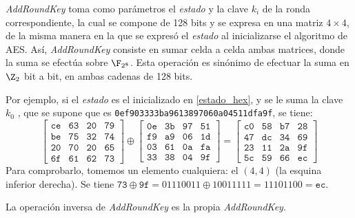\textit{AddRoundKey} toma como parámetros el \textit{estado} y la clave $k_i$ de la ronda correspondiente, la cual se compone de 128 bits y se expresa en una matriz $4 \times 4$, de la misma manera en la que se expresó el \textit{estado} al inicializarse el algoritmo de AES. Así, \textit{AddRoundKey} consiste en sumar celda a celda ambas matrices, donde la suma se efectúa sobre $\F_{2^8}$. Esta operación es sinónimo de efectuar la suma en $\Z_2$ bit a bit, en ambas cadenas de 128 bits.


    Por ejemplo, si el \textit{estado} es el inicializado en \ref{estado_hex}, y se le suma la clave $k_0$ , que se supone que es \texttt{0ef903333ba9613897060a04511dfa9f}, se tiene:
    \[
    \begin{bmatrix}
        \texttt{ce} & \texttt{63} & \texttt{20} & \texttt{79} \\
        \texttt{be} & \texttt{75} & \texttt{32} & \texttt{74} \\
        \texttt{20} & \texttt{70} & \texttt{20} & \texttt{65} \\
        \texttt{6f} & \texttt{61} & \texttt{62} & \texttt{73}
    \end{bmatrix}
    \oplus
    \begin{bmatrix}
        \texttt{0e} & \texttt{3b} & \texttt{97} & \texttt{51} \\
        \texttt{f9} & \texttt{a9} & \texttt{06} & \texttt{1d} \\
        \texttt{03} & \texttt{61} & \texttt{0a} & \texttt{fa} \\
        \texttt{33} & \texttt{38} & \texttt{04} & \texttt{9f}
    \end{bmatrix}
    =
    \begin{bmatrix}
        \texttt{c0} & \texttt{58} & \texttt{b7} & \texttt{28} \\
        \texttt{47} & \texttt{dc} & \texttt{34} & \texttt{69} \\
        \texttt{23} & \texttt{11} & \texttt{2a} & \texttt{9f} \\
        \texttt{5c} & \texttt{59} & \texttt{66} & \texttt{ec}
    \end{bmatrix}
    \]
    Para comprobarlo, tomemos un elemento cualquiera: el $(4,4)$ (la esquina inferior derecha). Se tiene $\texttt{73} \oplus \texttt{9f} = 01110011 \oplus 10011111 = 11101100 = \texttt{ec}$.


La operación inversa de \textit{AddRoundKey} es la propia \textit{AddRoundKey}.
\vspace{-1em}
